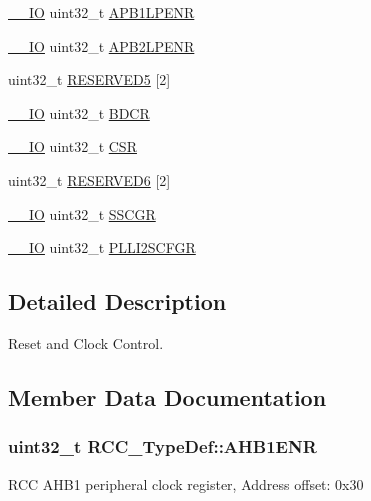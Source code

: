 \begin{DoxyCompactItemize}
\item 
\hyperlink{core__cm4_8h_aec43007d9998a0a0e01faede4133d6be}{\+\_\+\+\_\+\+IO} uint32\+\_\+t \hyperlink{struct_r_c_c___type_def_a5c8e710c40b642dcbf296201a7ecb2da}{A\+P\+B1\+L\+P\+E\+NR}
\item 
\hyperlink{core__cm4_8h_aec43007d9998a0a0e01faede4133d6be}{\+\_\+\+\_\+\+IO} uint32\+\_\+t \hyperlink{struct_r_c_c___type_def_a7e46c65220f00a6858a5b35b74a37b51}{A\+P\+B2\+L\+P\+E\+NR}
\item 
uint32\+\_\+t \hyperlink{struct_r_c_c___type_def_af9159a971013ef0592be8be3e256a344}{R\+E\+S\+E\+R\+V\+E\+D5} \mbox{[}2\mbox{]}
\item 
\hyperlink{core__cm4_8h_aec43007d9998a0a0e01faede4133d6be}{\+\_\+\+\_\+\+IO} uint32\+\_\+t \hyperlink{struct_r_c_c___type_def_a05be375db50e8c9dd24fb3bcf42d7cf1}{B\+D\+CR}
\item 
\hyperlink{core__cm4_8h_aec43007d9998a0a0e01faede4133d6be}{\+\_\+\+\_\+\+IO} uint32\+\_\+t \hyperlink{struct_r_c_c___type_def_a7e913b8bf59d4351e1f3d19387bd05b9}{C\+SR}
\item 
uint32\+\_\+t \hyperlink{struct_r_c_c___type_def_a30cfd1a2f2eb931bacfd2be965e53d1b}{R\+E\+S\+E\+R\+V\+E\+D6} \mbox{[}2\mbox{]}
\item 
\hyperlink{core__cm4_8h_aec43007d9998a0a0e01faede4133d6be}{\+\_\+\+\_\+\+IO} uint32\+\_\+t \hyperlink{struct_r_c_c___type_def_a52270ad1423c68cd536f62657bb669f5}{S\+S\+C\+GR}
\item 
\hyperlink{core__cm4_8h_aec43007d9998a0a0e01faede4133d6be}{\+\_\+\+\_\+\+IO} uint32\+\_\+t \hyperlink{struct_r_c_c___type_def_ac3beb02dccd9131d6ce55bb29c5fa69f}{P\+L\+L\+I2\+S\+C\+F\+GR}
\end{DoxyCompactItemize}


\subsection{Detailed Description}
Reset and Clock Control. 

\subsection{Member Data Documentation}
\subsubsection[{\texorpdfstring{A\+H\+B1\+E\+NR}{AHB1ENR}}]{ uint32\+\_\+t R\+C\+C\+\_\+\+Type\+Def\+::\+A\+H\+B1\+E\+NR}\hypertarget{struct_r_c_c___type_def_af58a7ad868f07f8759eac3e31b6fa79e}{}\label{struct_r_c_c___type_def_af58a7ad868f07f8759eac3e31b6fa79e}
R\+CC A\+H\+B1 peripheral clock register, Address offset\+: 0x30 
